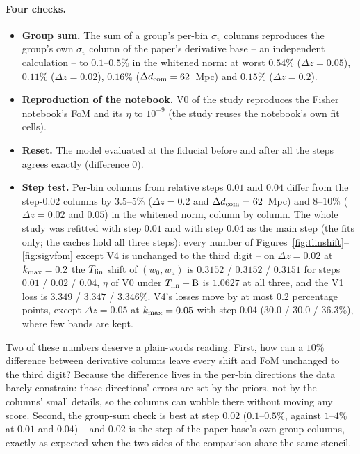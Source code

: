 \documentclass[11pt]{article}
\newcommand{\sv}{\sigma_v}
\newcommand{\kmax}{k_{\rm max}}
\newcommand{\dcom}{$\Delta d_{\rm com} = 62$~Mpc}
\begin{document}
\paragraph{Four checks.}
\begin{itemize}
  \item \textbf{Group sum.}  The sum of a group's per-bin $\sv$
    columns reproduces the group's own $\sv$ column of the paper's
    derivative base -- an independent calculation -- to
    $0.1$--$0.5\%$ in the whitened norm: at worst $0.54\%$
    ($\Delta z = 0.05$), $0.11\%$ ($\Delta z = 0.02$), $0.16\%$
    (\dcom) and $0.15\%$ ($\Delta z = 0.2$).
  \item \textbf{Reproduction of the notebook.}  V0 of the study
    reproduces the Fisher notebook's FoM and its $\eta$ to $10^{-9}$
    (the study reuses the notebook's own fit cells).
  \item \textbf{Reset.}  The model evaluated at the fiducial before
    and after all the steps agrees exactly (difference $0$).
  \item \textbf{Step test.}  Per-bin columns from relative steps
    $0.01$ and $0.04$ differ from the step-$0.02$ columns by
    $3.5$--$5\%$ ($\Delta z = 0.2$ and \dcom) and $8$--$10\%$
    ($\Delta z = 0.02$ and $0.05$) in the whitened norm, column by
    column.  The whole study was refitted with step $0.01$ and with
    step $0.04$ as the main step (the fits only; the caches hold all
    three steps): every number of
    Figures~\ref{fig:tlinshift}--\ref{fig:sigvfom} except V4 is
    unchanged to the third digit -- on $\Delta z = 0.02$ at
    $\kmax = 0.2$ the $T_{\rm lin}$ shift of $(w_0, w_a)$ is
    $0.3152$ / $0.3152$ / $0.3151$ for steps $0.01$ / $0.02$ /
    $0.04$, $\eta$ of V0 under $T_{\rm lin} + {\rm B}$ is $1.0627$
    at all three, and the V1 loss is $3.349$ / $3.347$ / $3.346\%$.
    V4's losses move by at most $0.2$ percentage points, except
    $\Delta z = 0.05$ at $\kmax = 0.05$ with step $0.04$
    ($30.0$ / $30.0$ / $36.3\%$), where few bands are kept.
\end{itemize}
Two of these numbers deserve a plain-words reading.  First, how can
a $10\%$ difference between derivative columns leave every shift and
FoM unchanged to the third digit?  Because the difference lives in
the per-bin directions the data barely constrain: those directions'
errors are set by the priors, not by the columns' small details, so
the columns can wobble there without moving any score.  Second, the
group-sum check is best at step $0.02$ ($0.1$--$0.5\%$, against
$1$--$4\%$ at $0.01$ and $0.04$) -- and $0.02$ is the step of the
paper base's own group columns, exactly as expected when the two
sides of the comparison share the same stencil.
\end{document}
